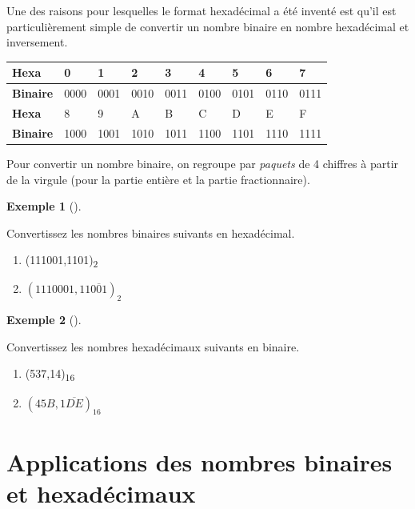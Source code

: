 \documentclass[
  letterpaper,
]{scrbook}
\providecommand{\tightlist}{%
  \setlength{\itemsep}{0pt}\setlength{\parskip}{0pt}}\usepackage{longtable,booktabs,array}
\theoremstyle{definition}
\newtheorem{example}{Exemple}[chapter]
\theoremstyle{definition}
\theoremstyle{plain}
\theoremstyle{remark}
\begin{document}
Une des raisons pour lesquelles le format hexadécimal a été inventé est
qu'il est particulièrement simple de convertir un nombre binaire en
nombre hexadécimal et inversement.

\begin{longtable}[]{@{}lllllllll@{}}
\toprule()
\textbf{Hexa} & 0 & 1 & 2 & 3 & 4 & 5 & 6 & 7 \\
\midrule()
\endhead
\textbf{Binaire} & 0000 & 0001 & 0010 & 0011 & 0100 & 0101 & 0110 &
0111 \\
\textbf{Hexa} & 8 & 9 & A & B & C & D & E & F \\
\textbf{Binaire} & 1000 & 1001 & 1010 & 1011 & 1100 & 1101 & 1110 &
1111 \\
\bottomrule()
\end{longtable}

Pour convertir un nombre binaire, on regroupe par \emph{paquets} de 4
chiffres à partir de la virgule (pour la partie entière et la partie
fractionnaire).

\leavevmode{}%
\begin{example}[]\label{exm-conversion-binaire-hexadecimal}

Convertissez les nombres binaires suivants en hexadécimal.

\begin{enumerate}
\def\labelenumi{\alph{enumi})}
\tightlist
\item
  (111001,1101)\textsubscript{2}
\item
  \((1110001,11\overline{001})_2\)
\end{enumerate}

\end{example}

\leavevmode{}%
\begin{example}[]\label{exm-conversion-hexadecimal-binaire}

Convertissez les nombres hexadécimaux suivants en binaire.

\begin{enumerate}
\def\labelenumi{\alph{enumi})}
\tightlist
\item
  (537,14)\textsubscript{16}
\item
  \((45B,1\overline{DE})_{16}\)
\end{enumerate}

\end{example}

\hypertarget{applications-des-nombres-binaires-et-hexaduxe9cimaux}{%
\section{Applications des nombres binaires et
hexadécimaux}\label{applications-des-nombres-binaires-et-hexaduxe9cimaux}}
\end{document}
